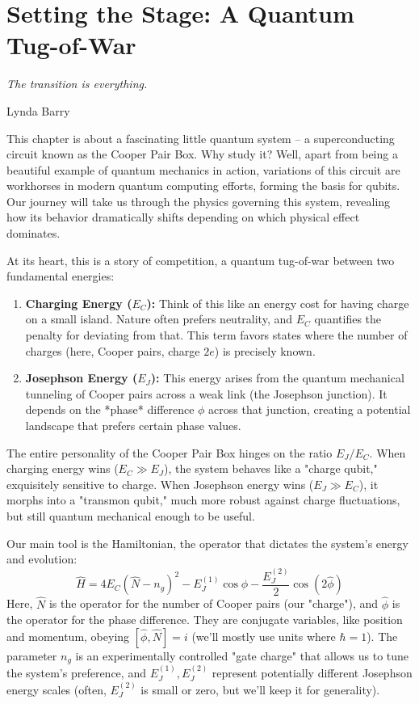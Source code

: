 \documentclass{book}
\begin{document}
\chapter*{Setting the Stage: A Quantum Tug-of-War}
\label{chap:prologue}

\epigraph{\textit{The transition is everything.}}{Lynda Barry}

This chapter is about a fascinating little quantum system – a superconducting circuit known as the Cooper Pair Box. Why study it? Well, apart from being a beautiful example of quantum mechanics in action, variations of this circuit are workhorses in modern quantum computing efforts, forming the basis for qubits. Our journey will take us through the physics governing this system, revealing how its behavior dramatically shifts depending on which physical effect dominates.

At its heart, this is a story of competition, a quantum tug-of-war between two fundamental energies:
\begin{enumerate}
    \item \textbf{Charging Energy ($E_C$):} Think of this like an energy cost for having charge on a small island. Nature often prefers neutrality, and $E_C$ quantifies the penalty for deviating from that. This term favors states where the number of charges (here, Cooper pairs, charge \(2e\)) is precisely known.
    \item \textbf{Josephson Energy ($E_J$):} This energy arises from the quantum mechanical tunneling of Cooper pairs across a weak link (the Josephson junction). It depends on the *phase* difference \(\phi\) across that junction, creating a potential landscape that prefers certain phase values.
\end{enumerate}

The entire personality of the Cooper Pair Box hinges on the ratio \(E_J / E_C\). When charging energy wins (\(E_C \gg E_J\)), the system behaves like a "charge qubit," exquisitely sensitive to charge. When Josephson energy wins (\(E_J \gg E_C\)), it morphs into a "transmon qubit," much more robust against charge fluctuations, but still quantum mechanical enough to be useful.

Our main tool is the Hamiltonian, the operator that dictates the system's energy and evolution:
\[ \hat{H} = 4 E_C (\hat{N} - n_g)^2 - E_J^{(1)} \cos \hat{\phi} - \frac{E_J^{(2)}}{2} \cos (2 \hat{\phi}) \]
Here, \(\hat{N}\) is the operator for the number of Cooper pairs (our "charge"), and \(\hat{\phi}\) is the operator for the phase difference. They are conjugate variables, like position and momentum, obeying \([\hat{\phi}, \hat{N}] = i\) (we'll mostly use units where \(\hbar = 1\)). The parameter \(n_g\) is an experimentally controlled "gate charge" that allows us to tune the system's preference, and \(E_J^{(1)}, E_J^{(2)}\) represent potentially different Josephson energy scales (often, \(E_J^{(2)}\) is small or zero, but we'll keep it for generality).
\end{document}
